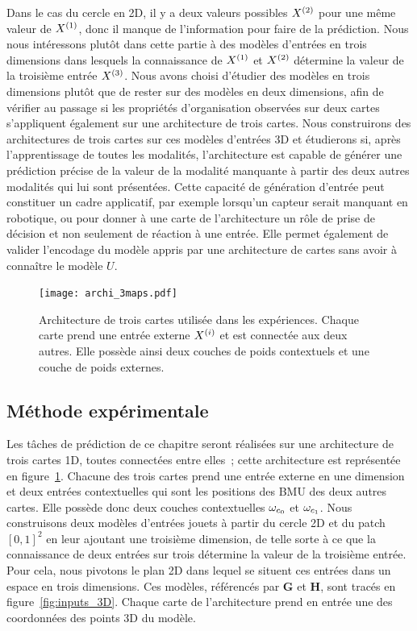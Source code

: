 \documentclass[../main]{subfiles}
\begin{document}
Dans le cas du cercle en 2D, il y a deux valeurs possibles $X^{({2})}$ pour une même valeur de $X^{({1})}$, donc il manque de l'information pour faire de la prédiction.
Nous nous intéressons plutôt dans cette partie à des modèles d'entrées en trois dimensions dans lesquels la connaissance de $X^{({1})}$ et $X^{({2})}$ détermine la valeur de la troisième entrée $X^{({3})}$.
Nous avons choisi d'étudier des modèles en trois dimensions plutôt que de rester sur des modèles en deux dimensions, afin de vérifier au passage si les propriétés d'organisation observées sur deux cartes s'appliquent également sur une architecture de trois cartes.
Nous construirons des architectures de trois cartes sur ces modèles d'entrées 3D et étudierons si, après l'apprentissage de toutes les modalités, l'architecture est capable de générer une prédiction précise de la valeur de la modalité manquante à partir des deux autres modalités qui lui sont présentées.
Cette capacité de génération d'entrée peut constituer un cadre applicatif, par exemple lorsqu'un capteur serait manquant en robotique, ou pour donner à une carte de l'architecture un rôle de prise de décision et non seulement de réaction à une entrée.
Elle permet également de valider l'encodage du modèle appris par une architecture de cartes sans avoir à connaître le modèle $U$.


\begin{figure}[H]
	\centering\texttt{[image: archi\_3maps.pdf]}
	\vspace{-0.5cm}
	\caption{Architecture de trois cartes utilisée dans les expériences. Chaque carte prend une entrée externe $X^{({i})}$ et est connectée aux deux autres. Elle possède ainsi deux couches de poids contextuels et une couche de poids externes.\label{fig:archi_3maps}}
\end{figure}

\subsection{Méthode expérimentale}

Les tâches de prédiction de ce chapitre seront réalisées sur une architecture de trois cartes 1D, toutes connectées entre elles~; cette architecture est représentée en figure~\ref{fig:archi_3maps}.
Chacune des trois cartes prend une entrée externe en une dimension et deux entrées contextuelles qui sont les positions des BMU des deux autres cartes. Elle possède donc deux couches contextuelles $\omega_{c_0}$ et $\omega_{c_1}$.
Nous construisons deux modèles d'entrées jouets à partir du cercle 2D et du patch $[0,1]^2$ en leur ajoutant une troisième dimension, de telle sorte à ce que la connaissance de deux entrées sur trois détermine la valeur de la troisième entrée. Pour cela, nous pivotons le plan 2D dans lequel se situent ces entrées dans un espace en trois dimensions.
Ces modèles, référencés par \textbf{G} et \textbf{H}, sont tracés en figure~\ref{fig:inputs_3D}.
Chaque carte de l'architecture prend en entrée une des coordonnées des points 3D du modèle.
\end{document}
